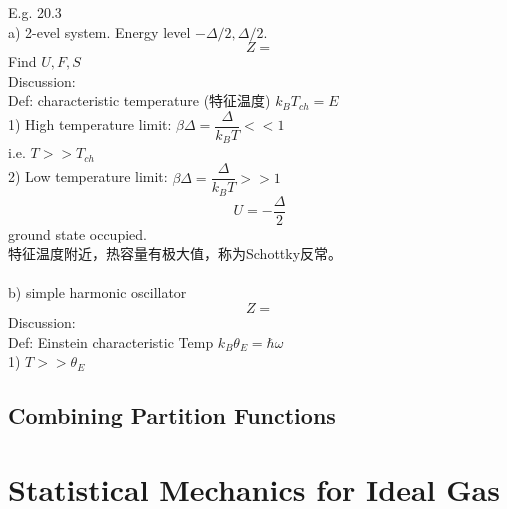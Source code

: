 \documentclass[UTF8]{ctexart} %
\numberwithin{equation}{subsection}
\begin{document}
E.g. 20.3\\
a) 2-evel system. Energy level $-\Delta/2,\Delta/2$.\\
\begin{equation}\label{key}
Z = 
\end{equation}
Find $U, F, S$\\
Discussion:\\
Def: characteristic temperature (特征温度) $k_B T_{ch} = E$\\
1) High temperature limit: $\beta\Delta = \dfrac{\Delta}{k_B T} << 1$\\
i.e. $T >> T_{ch}$\\
2) Low temperature limit: $\beta\Delta = \dfrac{\Delta}{k_B T} >> 1$\\
\begin{equation}\label{key}
U = -\dfrac{\Delta}{2}
\end{equation}
ground state occupied.\\
特征温度附近，热容量有极大值，称为Schottky反常。\\
~\\
b) simple harmonic oscillator
\begin{equation}\label{key}
Z = 
\end{equation}
Discussion:\\
Def: Einstein characteristic Temp $k_B \theta_E = \hbar\omega$\\
1) $T >> \theta_E$



\subsection{}

\subsection{Combining Partition Functions}

\section{Statistical Mechanics for Ideal Gas}
\end{document}
